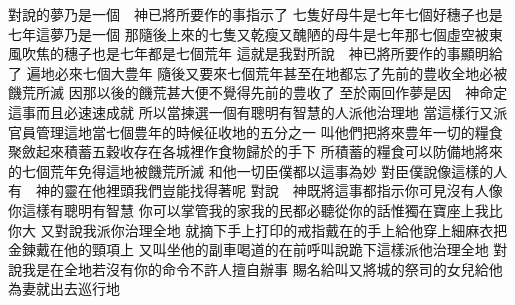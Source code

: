 對說\chientien{}的夢乃是一個\chientien 　神已將所要作的事指示了\chuan 
{}七隻好母牛是七年\yuentien 七個好穗子也是七年\yuentien 這夢乃是一個\chuan 
{}那隨後上來的七隻又乾瘦\chientien 又醜陋的母牛是七年\chientien 那七個虛空被東風吹焦的穗子也是七年\yuentien 都是七個荒年\chuan 
{}這就是我對所說\chientien 　神已將所要作的事顯明給了\chuan 
{}遍地必來七個大豊年\yuentien 
{}隨後又要來七個荒年\chientien 甚至在地都忘了先前的豊收\chientien 全地必被饑荒所滅\chuan 
{}因那以後的饑荒甚大\chientien 便不覺得先前的豊收了\chuan 
{}至於兩回作夢\chientien 是因　神命定這事\chientien 而且必速速成就\chuan 
{}所以當揀選一個有聰明有智慧的人\chientien 派他治理地\chuan 
{}當這樣行\chientien 又派官員管理這地\yuentien 當七個豊年的時候\chientien 征收地的五分之一\yuentien 
{}叫他們把將來豊年一切的糧食聚斂起來\chientien 積蓄五穀\chientien 收存在各城裡作食物\chientien 歸於的手下\chuan 
{}所積蓄的糧食\chientien 可以防備地將來的七個荒年\chientien 免得這地被饑荒所滅\chuan\Chuan
{}和他一切臣僕\chientien 都以這事為妙\chuan 
{}對臣僕說\chientien 像這樣的人\chientien 有　神的靈在他裡頭\chientien 我們豈能找得著呢\chuan 
{}對說\chientien 　神既將這事都指示你\chientien 可見沒有人像你這樣有聰明有智慧\chuan 
{}你可以掌管我的家\chientien 我的民都必聽從你的話\chientien 惟獨在寶座上我比你大\chuan 
{}又對說\chientien 我派你治理全地\chuan 
{}就摘下手上打印的戒指\chientien 戴在的手上\yuentien 給他穿上細麻衣\chientien 把金鍊戴在他的頸項上\chuan 
{}又叫坐他的副車\chientien 喝道的在前呼叫說\chientien 跪下\yuentien 這樣\chientien{}派他治理全地\chuan 
{}對說\chientien 我是\chientien 在全地\chientien 若沒有你的命令\chientien 不許人擅自辦事\chuan{}
賜名給\chientien 叫\yuentien 又將城的祭司的女兒\chientien 給他為妻\chuan{}就出去巡行地\chuan\Chuan
